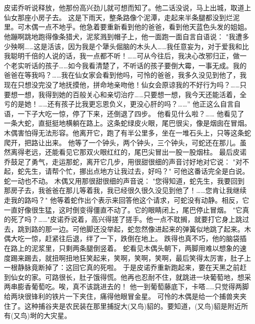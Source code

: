 \documentclass[12pt,UTF8]{ctexbook}
\begin{document}
\chapter{}

皮诺乔听说释放，他那份高兴劲儿就可想而知了。他二话没说，马上出城，取道上仙女那座小房子去。
这是下雨天，整条路像个泥潭，走起来半条腿都没到烂泥里。可木偶一点不地乎。他急着要重新看到他的爸爸，看到他天蓝色头发的姐姐。他蹦啊跳地跑得像条猎犬，泥浆溅到帽子上，他一面跑一面自言自语说：
"我遭多少殃啊……这是活该，因为我是个犟头倔脑的木头人……我任意妄为，对于爱我和比我聪明千倍的人说的话，我一点都不听！……可从今往后，我决心改邪归正，做一个老实听话的孩子……如今我看清楚了，不听话的孩子要倒大霉，一事无成。我的爸爸在等我吗？……我在仙女家会看到他吗，可怜的爸爸，我多久没见到他了，我现在只想没完没了地抚摸他，拼命地亲吻他！仙女会原谅我的不好行为吗？……只要想一想，我得到她的百般关心和亲切治疗……只要想一想，我今天还能活着，全亏的是她！……还有孩子比我更忘恩负义，更没心肝的吗？……”
他正这么自言自语，一下子大吃一惊，停了下来，还倒退了四步。
他看见什么啦？……
他看见了一条大蛇，直挺挺地横躺在路上。这条蛇绿皮火眼，尾巴很尖，像是烟囱在冒烟。
木偶害怕得无法形容。他离开它，跑了有半公里多，坐在一堆石头上，只等这条蛇爬开，把路让出来。
他等了一个钟头，两个钟头，三个钟头，可蛇还在那儿。虽然离得老远，还能看见它那双火眼红红的，尾巴尖冒出一股一股烟柱。
最后皮诺乔鼓足了勇气，走运那蛇，离开它几步，用很甜很细的声音讨好地对它说：
"对不起，蛇先生，请帮个忙，挪出点地方让我过去，好吗？"
可他这番话完全是白说。蛇一动也不动。
木偶又用那很甜很细的声音说：
"您得知道，蛇先生，我要回到那房子去，我爸爸在那儿等着我，我已经很久很久没见到他了！……您肯让我继续走我的路吗？"
他等着蛇作出个表示来回答他这个请求，可蛇没有动静。相反，它一直好像很生猛，这时倒变得僵直不动了。它的眼睛闭上，尾巴停止冒烟。
"它真的死了吗？……"皮诺乔说着，高兴得搓了搓手。他一点不耽搁，就要打它身上跳过去，跳到路的那一边。可他脚还没举起，蛇忽然像进起来的弹簧似地跳了起来。木偶大吃一惊，赶紧往后退，绊了一下，跌倒在地上。
跌得也真不巧，他的脑袋插在路上的泥浆里，只剩两条腿倒竖着。
蛇看见木偶头朝下，两脚用难以想象的速度踢来踢去，就扭啊扭地狂笑起来，笑啊，笑啊，笑啊，最后笑得太厉害，肚子上一根静脉竟断掉了：这回它真的死啦。
于是皮诺乔重新跑起来，要在天黑之前赶到仙女的家。可路很长，肚子饿得慌。他再也忍耐不住，就跳进一块葡萄地，想采两串膨香葡萄吃。唉，真不该跳进去的！
他一到葡萄藤底下，卡嗒……只觉得两脚给两块很锋利的铁片一下夹住，痛得他眼冒金星。
可怜的木偶是给一个捕兽夹夹住了。这种捕谷夹是农民装在那里捕捉大(又鸟)貂的。要知道，(又鸟)貂是附近所有(又鸟)埘的大灾星。

\chapter{}
\end{document}
